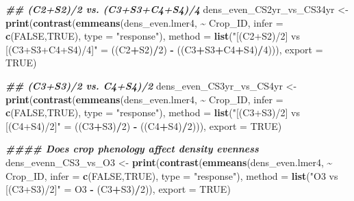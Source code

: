 \documentclass[
]{article}
\newenvironment{Shaded}{\begin{snugshade}}{\end{snugshade}}
\newcommand{\AttributeTok}[1]{\textcolor[rgb]{0.13,0.29,0.53}{#1}}
\newcommand{\ConstantTok}[1]{\textcolor[rgb]{0.56,0.35,0.01}{#1}}
\newcommand{\DecValTok}[1]{\textcolor[rgb]{0.00,0.00,0.81}{#1}}
\newcommand{\DocumentationTok}[1]{\textcolor[rgb]{0.56,0.35,0.01}{\textbf{\textit{#1}}}}
\newcommand{\FunctionTok}[1]{\textcolor[rgb]{0.13,0.29,0.53}{\textbf{#1}}}
\newcommand{\NormalTok}[1]{#1}
\newcommand{\OtherTok}[1]{\textcolor[rgb]{0.56,0.35,0.01}{#1}}
\newcommand{\SpecialCharTok}[1]{\textcolor[rgb]{0.81,0.36,0.00}{\textbf{#1}}}
\newcommand{\StringTok}[1]{\textcolor[rgb]{0.31,0.60,0.02}{#1}}
\begin{document}
\begin{Shaded}
\begin{Highlighting}[]
\DocumentationTok{\#\# (C2+S2)/2 vs. (C3+S3+C4+S4)/4}
\NormalTok{dens\_even\_CS2yr\_vs\_CS34yr }\OtherTok{\textless{}{-}} \FunctionTok{print}\NormalTok{(}\FunctionTok{contrast}\NormalTok{(}\FunctionTok{emmeans}\NormalTok{(dens\_even.lmer4, }\SpecialCharTok{\textasciitilde{}}\NormalTok{ Crop\_ID,}
                                                    \AttributeTok{infer =} \FunctionTok{c}\NormalTok{(}\ConstantTok{FALSE}\NormalTok{,}\ConstantTok{TRUE}\NormalTok{), }
                                                    \AttributeTok{type =} \StringTok{"response"}\NormalTok{),}
                                            \AttributeTok{method =} \FunctionTok{list}\NormalTok{(}\StringTok{"[(C2+S2)/2] vs [(C3+S3+C4+S4)/4]"} \OtherTok{=}
\NormalTok{                                                            ((C2}\SpecialCharTok{+}\NormalTok{S2)}\SpecialCharTok{/}\DecValTok{2}\NormalTok{) }\SpecialCharTok{{-}}\NormalTok{ ((C3}\SpecialCharTok{+}\NormalTok{S3}\SpecialCharTok{+}\NormalTok{C4}\SpecialCharTok{+}\NormalTok{S4)}\SpecialCharTok{/}\DecValTok{4}\NormalTok{))),}
                                   \AttributeTok{export =} \ConstantTok{TRUE}\NormalTok{)}

\DocumentationTok{\#\# (C3+S3)/2 vs. C4+S4)/2}
\NormalTok{dens\_even\_CS3yr\_vs\_CS4yr }\OtherTok{\textless{}{-}} \FunctionTok{print}\NormalTok{(}\FunctionTok{contrast}\NormalTok{(}\FunctionTok{emmeans}\NormalTok{(dens\_even.lmer4, }\SpecialCharTok{\textasciitilde{}}\NormalTok{ Crop\_ID,}
                                                   \AttributeTok{infer =} \FunctionTok{c}\NormalTok{(}\ConstantTok{FALSE}\NormalTok{,}\ConstantTok{TRUE}\NormalTok{),}
                                                   \AttributeTok{type =} \StringTok{"response"}\NormalTok{),}
                                           \AttributeTok{method =} \FunctionTok{list}\NormalTok{(}\StringTok{"[(C3+S3)/2] vs [(C4+S4)/2]"} \OtherTok{=} 
\NormalTok{                                                           ((C3}\SpecialCharTok{+}\NormalTok{S3)}\SpecialCharTok{/}\DecValTok{2}\NormalTok{) }\SpecialCharTok{{-}}\NormalTok{ ((C4}\SpecialCharTok{+}\NormalTok{S4)}\SpecialCharTok{/}\DecValTok{2}\NormalTok{))),}
                                  \AttributeTok{export =} \ConstantTok{TRUE}\NormalTok{)}

\DocumentationTok{\#\#\#\# Does crop phenology affect density evenness }
\NormalTok{dens\_evenn\_CS3\_vs\_O3 }\OtherTok{\textless{}{-}} \FunctionTok{print}\NormalTok{(}\FunctionTok{contrast}\NormalTok{(}\FunctionTok{emmeans}\NormalTok{(dens\_even.lmer4, }\SpecialCharTok{\textasciitilde{}}\NormalTok{ Crop\_ID,}
                                               \AttributeTok{infer =} \FunctionTok{c}\NormalTok{(}\ConstantTok{FALSE}\NormalTok{,}\ConstantTok{TRUE}\NormalTok{),}
                                               \AttributeTok{type =} \StringTok{"response"}\NormalTok{),}
                                       \AttributeTok{method =} \FunctionTok{list}\NormalTok{(}\StringTok{"O3 vs [(C3+S3)/2]"} \OtherTok{=}\NormalTok{ O3 }\SpecialCharTok{{-}}\NormalTok{ (C3}\SpecialCharTok{+}\NormalTok{S3)}\SpecialCharTok{/}\DecValTok{2}\NormalTok{)), }
                              \AttributeTok{export =} \ConstantTok{TRUE}\NormalTok{)}


\end{Highlighting}
\end{Shaded}
\end{document}
